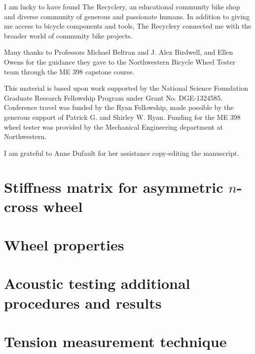 \documentclass{nuthesis}
\begin{document}
I am lucky to have found The Recyclery, an educational community bike shop and diverse community of generous and passionate humans. In addition to giving me access to bicycle components and tools, The Recyclery connected me with the broader world of community bike projects.

Many thanks to Professors Michael Beltran and J. Alex Birdwell, and Ellen Owens for the guidance they gave to the Northwestern Bicycle Wheel Tester team through the ME 398 capstone course.

This material is based upon work supported by the National Science Foundation Graduate Research Fellowship Program under Grant No. DGE-1324585. Conference travel was funded by the Ryan Fellowship, made possible by the generous support of Patrick G. and Shirley W. Ryan. Funding for the ME 398 wheel tester was provided by the Mechanical Engineering department at Northwestern.

I am grateful to Anne Dufault for her assistance copy-editing the manuscript.






\appendix
{}

\printunsrtglossary[type=symbols, style=long, title={List of symbols}]

\chapter{Stiffness matrix for asymmetric $n$-cross wheel}
\label{app:kbar_asymm}


\chapter{Wheel properties}
\label{app:wheel_properties}


\chapter{Acoustic testing additional procedures and results}
\label{app:acoustic_testing}


\chapter{Tension measurement technique}
\label{app:tension_measurement}

\end{document}
